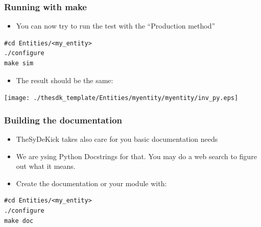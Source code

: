 \documentclass[logo=bluequo,normaltitle]{aaltoslides}
\begin{document}
\nextlines[45]
\begin{frame}[t,fragile]
    \frametitle{Running with make } 
    \begin{itemize}
        \item You can now try to run the test with the ``Production method''
    \end{itemize}
\begin{lstlisting}
#cd Entities/<my_entity>
./configure
make sim
\end{lstlisting}
    \begin{itemize}
        \item The result should be the same:
    \end{itemize}
    \begin{center}
        \texttt{[image: ./thesdk\_template/Entities/myentity/myentity/inv\_py.eps]}
    \end{center}
\end{frame}


\begin{frame}[t,fragile]
    \frametitle{Building the documentation} 
    \begin{itemize}
        \item TheSyDeKick takes also care for you basic documentation needs
        \item We are ysing Python Docstrings for that. You may do a web search
            to figure out what it means.
        \item Create the documentation or your module with:

    \end{itemize}
\begin{lstlisting}
#cd Entities/<my_entity>
./configure
make doc
\end{lstlisting}
\end{frame}
\end{document}
